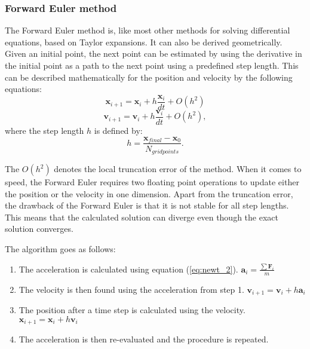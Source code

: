 \documentclass[10pt,a4paper,titlepage]{article}
\begin{document}
\subsubsection{Forward Euler method}
The Forward Euler method is, like most other methods for solving differential equations, based on Taylor expansions. It can also be derived geometrically. Given an initial point, the next point can be estimated by using the derivative in the initial point as a path to the next point using a predefined step length. This can be described mathematically for the position and velocity by the following equations:
\begin{equation}
\mathbf{x}_{i+1}=\mathbf{x}_i + h\frac{\mathbf{x}_i}{dt} + O(h^2)
\end{equation}
\begin{equation}
\mathbf{v}_{i+1}=\mathbf{v}_i + h\frac{\mathbf{v}_i}{dt} + O(h^2),
\end{equation}
where the step length $h$ is defined by:
\begin{equation}
h = \frac{\mathbf{x}_{final}-\mathbf{x}_0}{N_{grid points}}.
\end{equation}

The $O(h^2)$ denotes the local truncation error of the method. When it comes to speed, the Forward Euler requires two floating point operations to update either the position or the velocity in one dimension. Apart from the truncation error, the drawback of the Forward Euler is that it is not stable for all step lengths. This means that the calculated solution can diverge even though the exact solution converges. 

The algorithm goes as follows:
\begin{enumerate}%
\item The acceleration is calculated using equation (\ref{eq:newt_2}). \newline $\mathbf{a}_i=\frac{\sum\mathbf{F}_i}{m}$
\item The velocity is then found using the acceleration from step 1. \newline
$\mathbf{v}_{i+1}=\mathbf{v}_i+ h\mathbf{a}_i$
\item The position after a time step is calculated using the velocity.
\newline $\mathbf{x}_{i+1}=\mathbf{x}_i+h\mathbf{v}_i$

\item The acceleration is then re-evaluated and the procedure is repeated. 
\end{enumerate}
\end{document}

